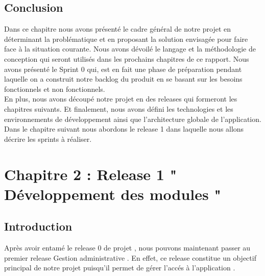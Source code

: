 \documentclass{article}
\begin{document}
\subsection{Conclusion}
Dans ce chapitre nous avons présenté le cadre général de notre projet en déterminant la problématique et en proposant la solution envisagée pour faire face à la situation courante. Nous avons dévoilé le langage et la méthodologie de conception qui seront utilisés dans les prochains chapitres de ce rapport. Nous avons présenté le Sprint 0 qui, est en fait une phase de préparation pendant laquelle on a construit notre backlog du produit en se basant sur les besoins fonctionnels et non fonctionnels.\\ En plus, nous avons découpé notre projet en des releases qui formeront les chapitres suivants. Et finalement, nous avons défini les technologies et les environnements de développement ainsi que l’architecture globale de l’application.
Dans le chapitre suivant nous abordons le release 1 dans laquelle nous allons décrire les sprints à réaliser.
\cleardoublepage
\setcounter{section}{2}

\section*{Chapitre 2 :  Release 1 " Développement des modules "}
\setcounter{subsection}{0}
\subsection{Introduction}
Après avoir entamé le release 0 de projet , nous
pouvons maintenant passer au premier release \guillemotleft Gestion administrative \guillemotright . En effet, ce
release constitue un objectif principal de notre projet puisqu'il permet de gérer l'accés à
l'application .
\end{document}
